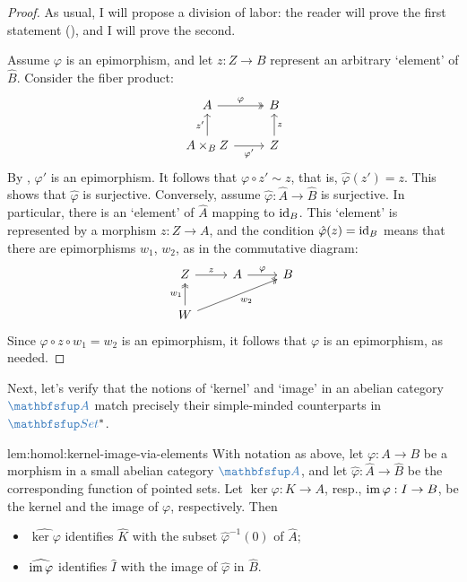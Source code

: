 \begin{proof}
  As usual, I will propose a division of labor: the reader will prove
  the first statement
  (), and I will prove
  the second.

  Assume $\varphi$ is an epimorphism, and let $z : Z \to B$ represent
  an arbitrary `element' of $\hat{B}$. Consider the fiber product:
  \[\begin{tikzcd}
      A \arrow[r, two heads, "\varphi"] & B \\
      A \times_B Z \arrow[u, "z'"] \arrow[r, "\varphi'"'] & Z
      \arrow[u, "z"']
    \end{tikzcd}\] By , $\varphi'$ is an
  epimorphism. It follows that $\varphi \circ z' \sim z$, that is,
  $\hat{\varphi}(z') = z$.  This shows that $\hat{\varphi}$ is
  surjective.  Conversely, assume
  $\hat{\varphi} : \hat{A} \to \hat{B}$ is surjective. In particular,
  there is an `element' of $\hat{A}$ mapping to $\operatorname{id}_B$. This
  `element' is represented by a morphism $z : Z \to A$, and the
  condition $\hat{\varphi}(z) = \operatorname{id}_B$ means that there are
  epimorphisms $w_1$, $w_2$, as in the commutative diagram:
  \[\begin{tikzcd}
      Z \arrow[r, "z"] & A \arrow[r, "\varphi"] & B \\
      W \arrow[u, two heads, "w_1"] \arrow[urr, two heads, "w_2"'] & &
    \end{tikzcd}\] Since $\varphi \circ z \circ w_1 = w_2$ is an
  epimorphism, it follows that $\varphi$ is an epimorphism, as needed.
\end{proof}
Next, let's verify that the notions of `kernel' and `image' in an
abelian category $\categ{A}$ match precisely their simple-minded
counterparts in $\categ{Set}^*$.

\begin{lem}{}{lem:homol:kernel-image-via-elements}
  With notation as above, let $\varphi : A \to B$ be a morphism in a
  small abelian category $\categ{A}$, and let
  $\hat{\varphi} : \hat{A} \to \hat{B}$ be the corresponding function
  of pointed sets. Let $\ker\varphi : K \to A$, resp.,
  $\operatorname{im}\varphi : I \to B$, be the kernel and the image of $\varphi$,
  respectively. Then
  \begin{itemize}
  \item $\widehat{\ker\varphi}$ identifies $\hat{K}$ with the subset
    $\hat{\varphi}^{-1}(0)$ of $\hat{A}$;
  \item $\widehat{\operatorname{im}\varphi}$ identifies $\hat{I}$ with the image
    of $\hat{\varphi}$ in $\hat{B}$.
  \end{itemize}
\end{lem}

